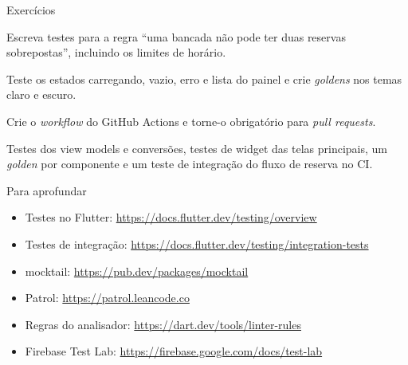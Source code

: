 \documentclass[aspectratio=169,10pt]{beamer}
\begin{document}
\begin{frame}{Exercícios}
  \begin{exercicio}
    Escreva testes para a regra ``uma bancada não pode ter duas reservas sobrepostas'', incluindo os limites de horário.
  \end{exercicio}
  \begin{exercicio}
    Teste os estados carregando, vazio, erro e lista do painel e crie \emph{goldens} nos temas claro e escuro.
  \end{exercicio}
  \begin{exercicio}[Exercício 3 --- CI]
    Crie o \emph{workflow} do GitHub Actions e torne-o obrigatório para \emph{pull requests}.
  \end{exercicio}
  \begin{projeto}
    Testes dos view models e conversões, testes de widget das telas principais, um \emph{golden} por componente e um teste de integração do fluxo de reserva no CI.
  \end{projeto}
\end{frame}

\begin{frame}{Para aprofundar}
  \small
  \begin{itemize}
    \item Testes no Flutter: \url{https://docs.flutter.dev/testing/overview}
    \item Testes de integração: \url{https://docs.flutter.dev/testing/integration-tests}
    \item mocktail: \url{https://pub.dev/packages/mocktail}
    \item Patrol: \url{https://patrol.leancode.co}
    \item Regras do analisador: \url{https://dart.dev/tools/linter-rules}
    \item Firebase Test Lab: \url{https://firebase.google.com/docs/test-lab}
  \end{itemize}
\end{frame}
\end{document}

